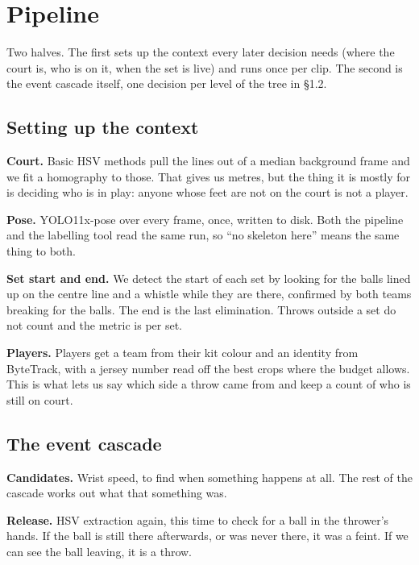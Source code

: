 \documentclass[10pt,a4paper]{article}
\begin{document}
\section{Pipeline}
\label{sec:pipeline}

Two halves. The first sets up the context every later decision needs (where the court is,
who is on it, when the set is live) and runs once per clip. The second is the event cascade
itself, one decision per level of the tree in \S1.2.

\subsection{Setting up the context}

\textbf{Court.} Basic HSV methods pull the lines out of a median background frame and we
fit a homography to those. That gives us metres, but the thing it is mostly for is deciding
who is in play: anyone whose feet are not on the court is not a player.

\textbf{Pose.} YOLO11x-pose over every frame, once, written to disk. Both the pipeline and
the labelling tool read the same run, so ``no skeleton here'' means the same thing to both.

\textbf{Set start and end.} We detect the start of each set by looking for the balls lined
up on the centre line and a whistle while they are there, confirmed by both teams breaking
for the balls. The end is the last elimination. Throws outside a set do not count and the
metric is per set.

\textbf{Players.} Players get a team from their kit colour and an identity from ByteTrack,
with a jersey number read off the best crops where the budget allows. This is what lets us
say which side a throw came from and keep a count of who is still on court.

\subsection{The event cascade}

\textbf{Candidates.} Wrist speed, to find when something happens at all. The rest of the
cascade works out what that something was.

\textbf{Release.} HSV extraction again, this time to check for a ball in the thrower's
hands. If the ball is still there afterwards, or was never there, it was a feint.
If we can see the ball leaving, it is a throw.
\end{document}
